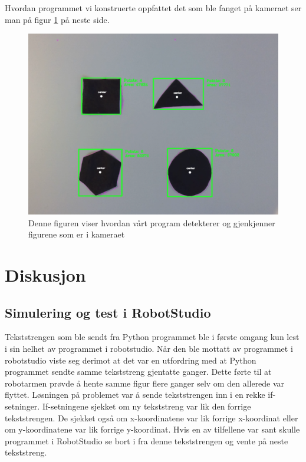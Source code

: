 \documentclass[conference]{IEEEtran}
\begin{document}
    Hvordan programmet vi konstruerte oppfattet det som ble fanget på kameraet ser man på figur \ref{resulatet:objekt} på neste side.
    \begin{figure}[!htb]
        \centering
        \includegraphics[width=.8\linewidth]{images/objektene.png}
        \caption{Denne figuren viser hvordan vårt program detekterer og gjenkjenner figurene som er i kameraet}
        \label{resulatet:objekt}
    \end{figure}

    
\section{Diskusjon}
    \subsection{Simulering og test i RobotStudio}
        Tekststrengen som ble sendt fra Python programmet ble i første omgang kun lest i sin helhet av programmet i robotstudio. Når den ble mottatt av programmet i robotstudio viste seg derimot at det var en utfordring med at Python programmet sendte samme tekststreng gjentatte ganger. Dette førte til at robotarmen prøvde å hente samme figur flere ganger selv om den allerede var flyttet. Løsningen på problemet var å sende tekststrengen inn i en rekke if-setninger. If-setningene sjekket om ny tekststreng var lik den forrige tekststrengen. De sjekket også om x-koordinatene var lik forrige x-koordinat eller om y-koordinatene var lik forrige y-koordinat. Hvis en av tilfellene var sant skulle programmet i RobotStudio se bort i fra denne tekststrengen og vente på neste tekststreng.
\end{document}
